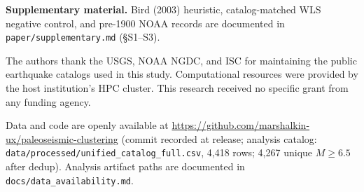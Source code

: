 \documentclass[draft]{agujournal2019}
\begin{document}
\noindent\textbf{Supplementary material.}
Bird (2003) heuristic, catalog-matched WLS negative control, and pre-1900 NOAA
records are documented in \texttt{paper/supplementary.md} (\S S1--S3).

\acknowledgments
The authors thank the USGS, NOAA NGDC, and ISC for maintaining the
public earthquake catalogs used in this study.
Computational resources were provided by the host institution's HPC cluster.
This research received no specific grant from any funding agency.

Data and code are openly available at
\url{https://github.com/marshalkin-ux/paleoseismic-clustering}
(commit recorded at release; analysis catalog:
\texttt{data/processed/unified\_catalog\_full.csv}, 4{,}418 rows;
4{,}267 unique $M \ge 6.5$ after dedup).
Analysis artifact paths are documented in \texttt{docs/data\_availability.md}.


\end{document}
